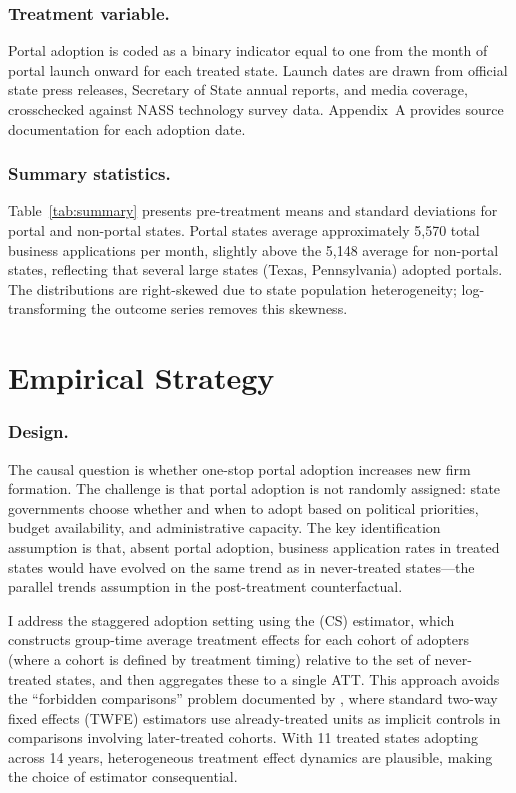 \documentclass[12pt]{article}
\begin{document}
\subsubsection*{Treatment variable.}
Portal adoption is coded as a binary indicator equal to one from the month of portal launch onward for each treated state. Launch dates are drawn from official state press releases, Secretary of State annual reports, and media coverage, crosschecked against NASS technology survey data. Appendix~A provides source documentation for each adoption date.

\subsubsection*{Summary statistics.}
Table~\ref{tab:summary} presents pre-treatment means and standard deviations for portal and non-portal states. Portal states average approximately 5,570 total business applications per month, slightly above the 5,148 average for non-portal states, reflecting that several large states (Texas, Pennsylvania) adopted portals. The distributions are right-skewed due to state population heterogeneity; log-transforming the outcome series removes this skewness.



\section{Empirical Strategy}

\subsubsection*{Design.}
The causal question is whether one-stop portal adoption increases new firm formation. The challenge is that portal adoption is not randomly assigned: state governments choose whether and when to adopt based on political priorities, budget availability, and administrative capacity. The key identification assumption is that, absent portal adoption, business application rates in treated states would have evolved on the same trend as in never-treated states---the parallel trends assumption in the post-treatment counterfactual.

I address the staggered adoption setting using the \citet{callaway2021} (CS) estimator, which constructs group-time average treatment effects for each cohort of adopters (where a cohort is defined by treatment timing) relative to the set of never-treated states, and then aggregates these to a single ATT. This approach avoids the ``forbidden comparisons'' problem documented by \citet{goodmanbacon2021}, where standard two-way fixed effects (TWFE) estimators use already-treated units as implicit controls in comparisons involving later-treated cohorts. With 11 treated states adopting across 14 years, heterogeneous treatment effect dynamics are plausible, making the choice of estimator consequential.
\end{document}
